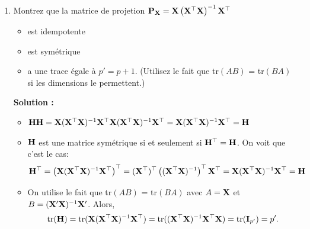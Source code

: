 \documentclass[letter, 11pt]{article}
\newcommand{\prof}[1]{\ifdefined\avecsolutions\par{\color{blue}\textbf{Solution :} #1}\par\fi}
\begin{document}
\begin{enumerate}[leftmargin=*, wide, label=\bf Exercice \arabic*:]
{\begin{itemize}
\begin{align*}
\begin{pmatrix}
            \dfrac{\partial \bf{v'Av}}{\partial v_1} \\[4mm]
            \dfrac{\partial \bf{v'Av}}{\partial v_2}
        \end{pmatrix}
        = \begin{pmatrix}
            6v_1+5v_2 \\[4mm]
            5v_1 + 4v_2
        \end{pmatrix}
        = \begin{pmatrix}
            6 & 5 \\[4mm]
            5 & 4
        \end{pmatrix}
        {\bold v}
        = (\bf{A}+\bf{A}')\bf{v}
    \end{align*}
    \end{itemize}}

\item Montrez que la matrice de projetion $\bold P_{\bold X} = \bold X \left( \bold X^\top \bold X\right)^{-1} \bold X^\top$
    \begin{itemize}
    \item[(a)] est idempotente
    \item[(b)] est symétrique 
    \item[(c)] a une trace égale à $p' = p+1$. (Utilisez le fait que  tr$(AB)$ = tr$(BA)$ si les dimensions le permettent.)
    \end{itemize}

\prof{
 \begin{itemize}
    \item[(a)]$\bold H\bold H = \bold X(\bold X^\top\bold X)^{-1}\bold X^\top\bold X(\bold X^\top\bold X)^{-1}\bold X^\top=\bold X(\bold X^\top\bold X)^{-1}\bold X^\top=\bold H$

    \item[(b)]$\bold H$ est une matrice symétrique si et seulement si $\bold H^\top=\bold H$. On voit  que c'est le cas:
    $$\bold H^\top = \left(\bold X(\bold X^\top\bold X)^{-1}\bold X^\top\right)^\top=(\bold X^\top)^\top\left((\bold X^\top\bold X)^{-1}\right)^\top\bold X^\top
    =\bold X(\bold X^\top\bold X)^{-1}\bold X^\top = \bold H$$
    \item[(c)]On utilise le fait que  tr$(AB)$ = tr$(BA)$ avec $A=\bold X$ et $B=(\bold X'\bold X)^{-1}\bold X'$. Alors,
    $$\mbox{tr}(\bold H) = \mbox{tr}(\bold X(\bold X^\top\bold X)^{-1}\bold X^\top)=\mbox{tr}((\bold X^\top\bold X)^{-1}\bold X^\top\bold X)=\mbox{tr}({\bold{I}_{p'}})=p'.$$
    \end{itemize}
}


\end{enumerate}
\end{document}

